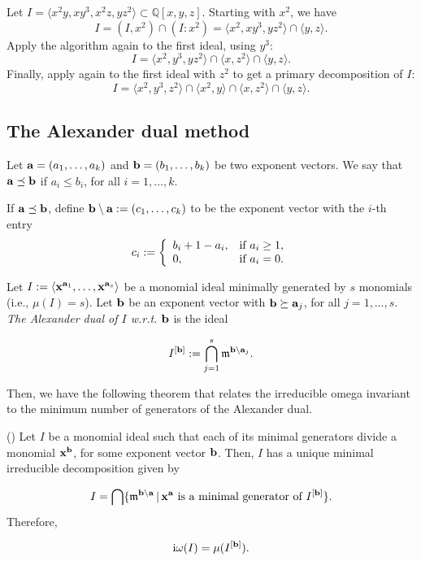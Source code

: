 \documentclass[11pt]{amsart}   %
\begin{document}
\begin{exm}\label{exm-quotient}
    Let $I=\langle x^2y, xy^3,x^2z,yz^2 \rangle \subset {\mathbb Q}[x,y,z]$. Starting with $x^2$, we have
    $$I=(I,x^2)\cap (I:x^2) = \langle x^2,xy^3,yz^2 \rangle \cap \langle y,z \rangle .$$
    Apply the algorithm again to the first ideal, using $y^3$:
    $$I=\langle x^2,y^3,yz^2\rangle \cap \langle x,z^2 \rangle \cap \langle y,z\rangle .$$
    Finally, apply again to the first ideal with $z^2$ to get a primary decomposition of $I$:
    $$I=\langle x^2,y^3,z^2\rangle \cap \langle x^2,y\rangle \cap \langle x,z^2 \rangle \cap \langle y,z\rangle.$$
\end{exm}

\medskip


\subsection{The Alexander dual method}\label{sec_Alex_dual}

Let ${\bf a}=(a_1,\ldots,a_k)$ and ${\bf b}=(b_1,\ldots,b_k)$ be two exponent vectors. We say that ${\bf a}\preceq {\bf b}$ if $a_i\leq b_i$, for all $i=1,\ldots,k$.

If ${\bf a}\preceq {\bf b}$, define ${\bf b}\setminus{\bf a}:=(c_1,\ldots,c_k)$ to be the exponent vector with the $i$-th entry
$$c_i:=\left\{
                          \begin{array}{ll}
                            b_i+1-a_i, & \hbox{if $a_i\geq 1$,} \\
                            0, & \hbox{if $a_i=0$.}
                          \end{array}
                        \right.$$


\medskip

Let $I:=\langle {\bf x}^{{\bf a}_1},\ldots, {\bf x}^{{\bf a}_s}\rangle$ be a monomial ideal minimally generated by $s$ monomials (i.e., $\mu(I)=s$). Let ${\bf b}$ be an exponent vector with ${\bf b}\succeq{\bf a}_j$, for all $j=1,\ldots,s$. {\em The Alexander dual of $I$ w.r.t. ${\bf b}$} is the ideal

$$I^{[{\bf b}]}:=\bigcap_{j=1}^s\frak m^{{\bf b}\setminus{\bf a}_j}.$$

Then, we have the following theorem that relates the irreducible omega invariant to the minimum number of generators of the Alexander dual.

\begin{thm}\label{thm_Alex_dual} (\cite[Theorem 5.27]{MiSt}) Let $I$ be a monomial ideal such that each of its minimal generators divide a monomial ${\bf x}^{\bf b}$, for some exponent vector ${\bf b}$. Then, $I$ has a unique minimal irreducible decomposition given by

$$I=\bigcap\{\frak m^{{\bf b}\setminus{\bf a}}\,|\, {\bf x}^{\bf a} \mbox{ is a minimal generator of } I^{[{\bf b}]}\}.$$ Therefore,

$${\rm i}\omega(I)=\mu(I^{[{\bf b}]}).$$    
\end{thm}
\end{document}
